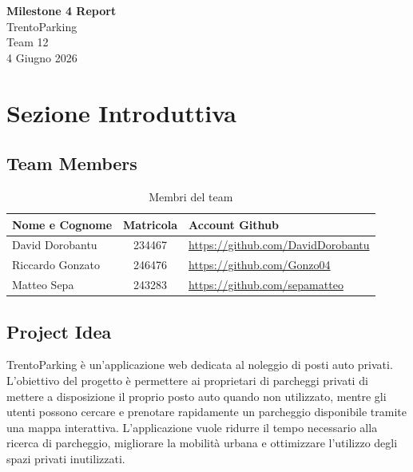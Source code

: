 \documentclass[a4paper,12pt]{article}
\begin{document}
\begin{center}
{\LARGE\textbf{Milestone 4 Report}\\[0.4em]
\Large TrentoParking}\\[1em]
{\large Team 12}\\[0.3em]
{\large 4 Giugno 2026}
\end{center}

\vspace{1.5em}
\tableofcontents
\newpage

\section{Sezione Introduttiva}

\subsection{Team Members}

\begin{table}[h!]
\centering
\begin{tabular}{|l|c|l|}
\hline
\textbf{Nome e Cognome} & \textbf{Matricola} & \textbf{Account Github} \\
\hline
David Dorobantu  & 234467 & \url{https://github.com/DavidDorobantu} \\
Riccardo Gonzato & 246476 & \url{https://github.com/Gonzo04} \\
Matteo Sepa      & 243283 & \url{https://github.com/sepamatteo} \\
\hline
\end{tabular}
\caption{Membri del team}
\end{table}

\subsection{Project Idea}

TrentoParking è un'applicazione web dedicata al noleggio di posti auto privati.
L'obiettivo del progetto è permettere ai proprietari di parcheggi privati di mettere
a disposizione il proprio posto auto quando non utilizzato, mentre gli utenti possono
cercare e prenotare rapidamente un parcheggio disponibile tramite una mappa interattiva.
L'applicazione vuole ridurre il tempo necessario alla ricerca di parcheggio, migliorare
la mobilità urbana e ottimizzare l'utilizzo degli spazi privati inutilizzati.
\end{document}
